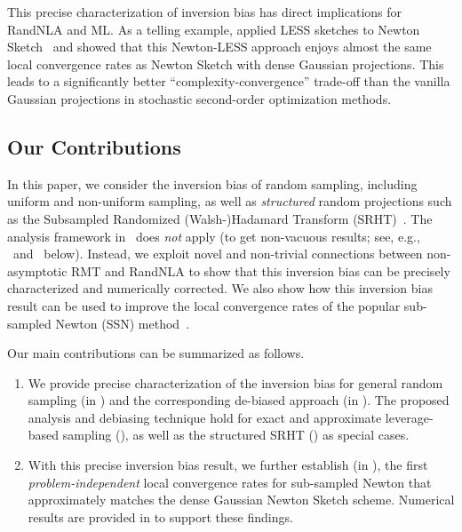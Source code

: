 \documentclass[11pt,a4paper]{article}
\begin{document}
This precise characterization of inversion bias has direct implications for RandNLA and ML. 
As a telling example, \citet{derezinski2021newtonless} applied LESS sketches to Newton Sketch~\citep{pilanci2017Newton} and showed that this Newton-LESS approach enjoys almost the same local convergence rates as Newton Sketch with dense Gaussian projections.
This leads to a significantly better ``complexity-convergence'' trade-off than the vanilla Gaussian projections in stochastic second-order optimization methods.


\subsection{Our Contributions} 

In this paper, we consider the inversion bias of random sampling, including uniform and non-uniform sampling, as well as \emph{structured} random projections such as the Subsampled Randomized (Walsh-)Hadamard Transform (SRHT)~\citep{ailon2006approximate}.
The analysis framework in~\citet{derezinski2021newtonless,derezinski2021sparse} does \emph{not} apply (to get non-vacuous results; see, e.g., ~and~ below).
Instead, we exploit novel and non-trivial connections between non-asymptotic RMT and RandNLA to show that this inversion bias can be precisely characterized and numerically corrected.
We also show how this inversion bias result can be used to improve the local convergence rates of the popular sub-sampled Newton (SSN) method~\citep{yao2018inexact,roosta2019subsampled,xu2020newton}.


Our main contributions can be summarized as follows.

\begin{enumerate}
    \item We provide precise characterization of the inversion bias for general random sampling (in ) and the corresponding de-biased approach (in ). 
    The proposed analysis and debiasing technique hold for exact and approximate leverage-based sampling (), as well as the structured SRHT () as special cases.
    \item With this precise inversion bias result, we further establish (in ), the first \emph{problem-independent} local convergence rates for sub-sampled Newton that approximately matches the dense Gaussian Newton Sketch scheme.
    Numerical results are provided in  to support these findings.
\end{enumerate}
\end{document}
